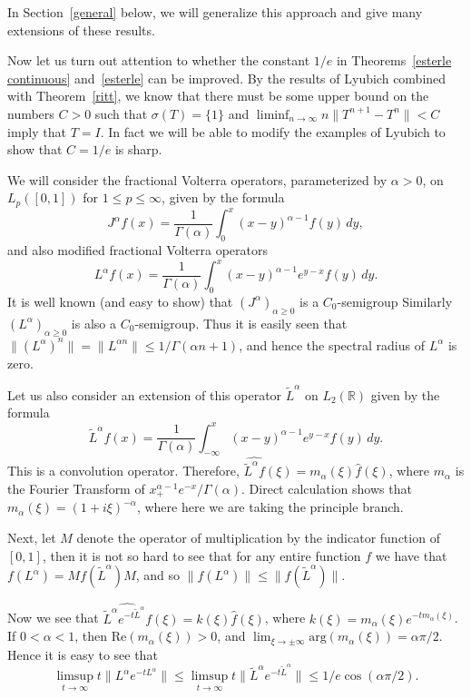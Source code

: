 \documentclass[12pt]{amsart}
\newcommand{\R}{{\mathbb R}}
\newcommand{\snormo}[1]{{\mathopen\|#1\mathclose\|}}
\begin{document}
In Section~\ref{general} below, we will generalize this approach
and give many extensions of these results.

Now let us turn out attention to whether the constant $1/e$ in
Theorems~\ref{esterle continuous} and~\ref{esterle} can be
improved. By the results of Lyubich \cite{lyubich2} combined with
Theorem~\ref{ritt}, we know that there must be some upper bound on
the numbers $C>0$ such that $\sigma(T) = \{1\}$ and
$\liminf_{n\to\infty} n \snormo{T^{n+1}-T^n} < C$ imply that
$T=I$. In fact we will be able to modify the examples of Lyubich
to show that $C = 1/e$ is sharp.

We will consider the fractional Volterra operators, parameterized
by $\alpha>0$, on $L_p([0,1])$ for $1 \le p \le \infty$, given by the
formula
$$ J^\alpha f(x) = \frac1{\Gamma(\alpha)}\int_0^x (x-y)^{\alpha-1}
   f(y) \, dy ,$$
and also modified fractional Volterra operators
$$ L^\alpha f(x) = \frac1{\Gamma(\alpha)}\int_0^x (x-y)^{\alpha-1}
   e^{y-x} f(y) \, dy .$$
It is well known (and easy to show)
that $(J^\alpha)_{\alpha\ge0}$ is a $C_0$-semigroup
Similarly $(L^\alpha)_{\alpha\ge0}$ is also a $C_0$-semigroup.
Thus it is easily seen that $\snormo{(L^\alpha)^n} = \snormo{L^{\alpha n}}
\le 1/\Gamma(\alpha n +1)$, and hence the spectral radius of $L^\alpha$
is zero.

Let us also consider an extension of this operator $\tilde L^\alpha$
on $L_2(\R)$ given by the formula
$$ \tilde L^\alpha f(x)
   = \frac1{\Gamma(\alpha)}\int_{-\infty}^x (x-y)^{\alpha-1}
   e^{y-x} f(y) \, dy .$$
This is a convolution operator.  Therefore,
$\widehat{\tilde L^\alpha f}(\xi) = m_\alpha(\xi) \hat f(\xi)$,
where $m_\alpha$ is the Fourier Transform of $x_+^{\alpha-1} e^{-x}
/\Gamma(\alpha)$.  Direct calculation shows that
$m_\alpha(\xi) = (1+i\xi)^{-\alpha}$,
where here we are taking the principle
branch.

Next,
let $M$ denote the operator of
multiplication by the indicator function of $[0,1]$, then
it is not so hard to see that for any entire function
$f$ we have that $f(L^\alpha) = M f(\tilde L^\alpha) M$, and so
$\snormo{f(L^\alpha)} \le \snormo{f(\tilde L^\alpha)}$.

Now we see that
$\widehat{\tilde L^\alpha e^{-t\tilde L^\alpha}f}(\xi) = k(\xi) \hat f(\xi)$,
where $k(\xi) = m_\alpha(\xi) e^{-t m_\alpha(\xi)}$.  If $0<\alpha<1$, then
$\text{Re}(m_\alpha(\xi)) > 0$, and
$\lim_{\xi\to\pm\infty} \text{arg}(m_\alpha(\xi)) = \alpha\pi/2$.  Hence
it is easy to see that
$$ \limsup_{t\to\infty} t\snormo{L^\alpha e^{-t L^\alpha}} \le
\limsup_{t\to\infty} t\snormo{\tilde L^\alpha e^{-t\tilde L^\alpha}} \le
1/e \cos(\alpha \pi/2) .$$
\end{document}
